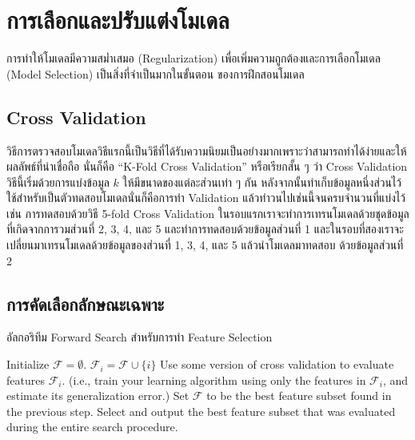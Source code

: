 

\chapter{การเลือกและปรับแต่งโมเดล}
\label{ch:reg_sel_model}

การทำให้โมเดลมีความสม่ำเสมอ (Regularization) เพื่อเพิ่มความถูกต้องและการเลือกโมเดล (Model Selection) เป็นสิ่งที่จำเป็นมากในขั้นตอน%
ของการฝึกสอนโมเดล

\section{Cross Validation}
\label{sec:cross_val}

วิธีการตรวจสอบโมเดลวิธีแรกนี้เป็นวิธีที่ได้รับความนิยมเป็นอย่างมากเพราะว่าสามารถทำได้ง่ายและให้ผลลัพธ์ที่น่าเชื่อถือ นั่นก็คือ 
\enquote{K-Fold Cross Validation} หรือเรียกสั้น ๆ ว่า Cross Validation วิธีนี้เริ่มด้วยการแบ่งข้อมูล $k$ ให้มีขนาดของแต่ละส่วนเท่า ๆ กัน 
หลังจากนั้นทำเก็บข้อมูลหนึ่งส่วนไว้ใช้สำหรับเป็นตัวทดสอบโมเดลนั่นก็คือการทำ Validation แล้วทําวนไปเช่นนี้จนครบจํานวนที่แบ่งไว้ เช่น 
การทดสอบด้วยวิธี 5-fold Cross Validation ในรอบแรกเราจะทำการเทรนโมเดลด้วยชุดข้อมูลที่เกิดจากการวมส่วนที่ 2, 3, 4, และ 5 
และทำการทดสอบด้วยข้อมูลส่วนที่ 1 และในรอบที่สองเราจะเปลี่ยนมาเทรนโมเดลด้วยข้อมูลของส่วนที่ 1, 3, 4, และ 5 แล้วนำโมเดลมาทดสอบ%
ด้วยข้อมูลส่วนที่ 2

\section{การคัดเลือกลักษณะเฉพาะ}
\label{sec:select_feat}

\begin{algorithm}[ht]
    \caption{อัลกอริทึม Forward Search สำหรับการทำ Feature Selection}
    \label{alg:forward_search}
    \begin{algorithmic}
    \State Initialize $\mathcal{F} = \emptyset$.
    \Repeat
                \State $\mathcal{F}_i = \mathcal{F} \cup \{i\}$
                \State Use some version of cross validation to evaluate features $\mathcal{F}_i$.
                \State (i.e., train your learning algorithm using only the features in $\mathcal{F}_i$, and 
                estimate its generalization error.)
            \EndIf
        \EndFor
        \State Set $\mathcal{F}$ to be the best feature subset found in the previous step. %
    \State Select and output the best feature subset that was evaluated during the entire search procedure.
    \end{algorithmic}
\end{algorithm}

